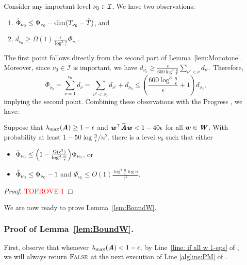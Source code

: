 Consider any important level $\nu_{0} \in \cal{I}$. We have two observations:
\begin{enumerate}
	\item \label{enu:phi 1} $\Phitil_{\nu_{0}}\leq\Phi_{\nu_{0}}-\dim{T_{\nu_{0}}-\tilde{T}}$, and 
	\item \label{enu:phi 2} $d_{\nu_{0}}\geq\Omega(1)\frac{\epsilon}{\log^{3}\frac{n}{\epsilon}}\Phi_{v_{0}}$. 
\end{enumerate}
The first point follows directly from the second part of Lemma~\ref{lem:Monotone}. Moreover, since $\nu_{0}\in\mathcal{I}$ is important, we have $d_{\nu_{0}}\geq\frac{\epsilon}{600\log^{3}\frac{n}{\epsilon}}\sum_{\nu'<\nu}d_{\nu'}.$ Therefore, 
\[
\Phi_{\nu_{0}}=\sum_{\nu=1}^{\nu_{0}}d_{\nu}=\sum_{\nu'<\nu_{0}}d_{\nu'}+d_{\nu_{0}}\leq\left(\frac{600\log^{3}\frac{n}{\epsilon}}{\epsilon}+1\right)d_{\nu_{0}},
\]
implying the second point. 
%
Combining these observations with the Progress , we have:
\begin{lemma}
	\label{claim:potential decrease}Suppose that $\lambda_{\max}(\AA)\ge1-\epsilon$ and $\ww^{\top}\AAtil\ww<1-40\epsilon$ for all $\ww\in\WW$. With probability at least $1-50\log\frac{n}{\epsilon}/n^{2}$, there is a level $\nu_{0}$ such that either 
	\begin{itemize}
		\item $\Phitil_{\nu_{0}}\le\left(1-\frac{\Omega(\epsilon^{2})}{\log^{4}\frac{n}{\epsilon}}\right)\Phi_{\nu_{0}}$, or 
		\item $\Phitil_{\nu_{0}}\le\Phi_{\nu_{0}}-1$ and $\Phi_{\nu_{0}}\leq O(1)\frac{\log^{4}\frac{n}{\epsilon}\log n}{\epsilon^{2}}.$
	\end{itemize}
\end{lemma}

\begin{proof}\textcolor{red}{TOPROVE 1}\end{proof}
We are now ready to prove Lemma~\ref{lem:BoundW}. 

\subsubsection*{Proof of Lemma~\ref{lem:BoundW}.}

First, observe that whenever $\lambda_{\max}(\AA)<1-\epsilon$, by Line~\ref{line: if all w 1-eps} of , we will always return $\textsc{False}$ at the next execution of Line \ref{algline:PM} of .

